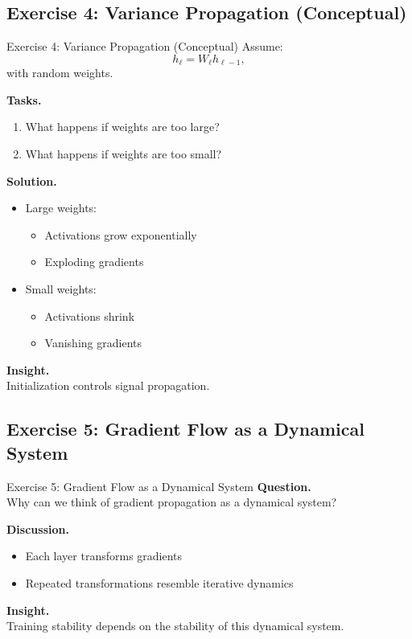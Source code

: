 \documentclass[aspectratio=169,11pt]{beamer}
\begin{document}
\subsection{Exercise 4: Variance Propagation (Conceptual)}
\begin{frame}[t,allowframebreaks]{Exercise 4: Variance Propagation (Conceptual)}
\small
Assume:
\[
h_\ell = W_\ell h_{\ell-1},
\]
with random weights.

\textbf{Tasks.}\\ \begin{enumerate}
    \item What happens if weights are too large?
    \item What happens if weights are too small?
\end{enumerate}

\textbf{Solution.}\\ \begin{itemize}
    \item Large weights:
    \begin{itemize}
        \item Activations grow exponentially
        \item Exploding gradients
    \end{itemize}

    \item Small weights:
    \begin{itemize}
        \item Activations shrink
        \item Vanishing gradients
    \end{itemize}
\end{itemize}

\textbf{Insight.}\\ Initialization controls signal propagation.
\end{frame}

\subsection{Exercise 5: Gradient Flow as a Dynamical System}
\begin{frame}[t,allowframebreaks]{Exercise 5: Gradient Flow as a Dynamical System}
\small
\textbf{Question.}\\ Why can we think of gradient propagation as a dynamical system?

\textbf{Discussion.}\\ \begin{itemize}
    \item Each layer transforms gradients
    \item Repeated transformations resemble iterative dynamics
\end{itemize}

\textbf{Insight.}\\ Training stability depends on the stability of this dynamical system.
\end{frame}
\end{document}
